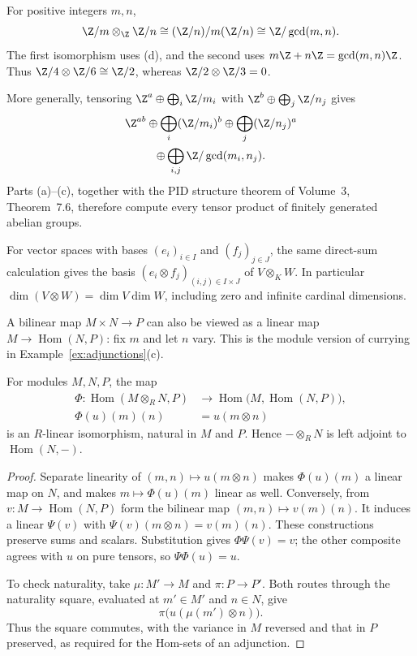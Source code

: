 \begin{example}\label{ex:zmzn}
For positive integers $m,n$,
\[
\Z/m\otimes_\Z\Z/n\cong(\Z/n)/m(\Z/n)
\cong\Z/\gcd(m,n).
\]
The first isomorphism uses (d), and the second uses $m\Z+n\Z=\gcd(m,n)\Z$. Thus $\Z/4\otimes\Z/6\cong\Z/2$, whereas $\Z/2\otimes\Z/3=0$.

More generally, tensoring $\Z^a\oplus\bigoplus_i\Z/m_i$ with $\Z^b\oplus\bigoplus_j\Z/n_j$ gives
\[
\begin{gathered}
\Z^{ab}\oplus\bigoplus_i(\Z/m_i)^b
\oplus\bigoplus_j(\Z/n_j)^a\\
\oplus\bigoplus_{i,j}\Z/\gcd(m_i,n_j).
\end{gathered}
\]
Parts (a)--(c), together with the PID structure theorem of Volume~3, Theorem~7.6, therefore compute every tensor product of finitely generated abelian groups.

For vector spaces with bases $(e_i)_{i\in I}$ and $(f_j)_{j\in J}$, the same direct-sum calculation gives the basis $(e_i\otimes f_j)_{(i,j)\in I\times J}$ of $V\otimes_KW$. In particular $\dim(V\otimes W)=\dim V\dim W$, including zero and infinite cardinal dimensions.
\end{example}

A bilinear map $M\times N\to P$ can also be viewed as a linear map $M\to\operatorname{Hom}(N,P)$: fix $m$ and let $n$ vary. This is the module version of currying in Example~\ref{ex:adjunctions}(c).

\begin{theorem}\label{thm:tensorhom}
For modules $M,N,P$, the map
\[
\begin{aligned}
\Phi\colon\operatorname{Hom}(M\otimes_RN,P)
&\longrightarrow\operatorname{Hom}\bigl(M,\operatorname{Hom}(N,P)\bigr),\\
\Phi(u)(m)(n)&=u(m\otimes n)
\end{aligned}
\]
is an $R$-linear isomorphism, natural in $M$ and $P$. Hence $-\otimes_RN$ is left adjoint to $\operatorname{Hom}(N,-)$.
\end{theorem}

\begin{proof}
Separate linearity of $(m,n)\mapsto u(m\otimes n)$ makes $\Phi(u)(m)$ a linear map on $N$, and makes $m\mapsto\Phi(u)(m)$ linear as well. Conversely, from $v\colon M\to\operatorname{Hom}(N,P)$ form the bilinear map $(m,n)\mapsto v(m)(n)$. It induces a linear $\Psi(v)$ with $\Psi(v)(m\otimes n)=v(m)(n)$. These constructions preserve sums and scalars. Substitution gives $\Phi\Psi(v)=v$; the other composite agrees with $u$ on pure tensors, so $\Psi\Phi(u)=u$.

To check naturality, take $\mu\colon M'\to M$ and $\pi\colon P\to P'$. Both routes through the naturality square, evaluated at $m'\in M'$ and $n\in N$, give
\[
\pi\bigl(u(\mu(m')\otimes n)\bigr).
\]
Thus the square commutes, with the variance in $M$ reversed and that in $P$ preserved, as required for the Hom-sets of an adjunction.
\end{proof}

